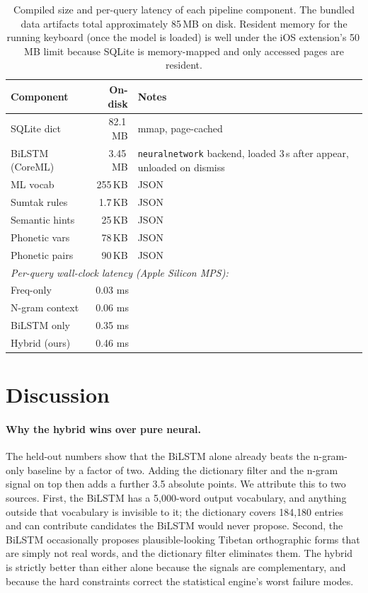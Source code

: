 \documentclass[11pt]{article}
\begin{document}
\begin{table}[t]
\centering
\small
\begin{tabular}{lrp{3.5cm}}
\toprule
Component & On-disk & Notes \\
\midrule
SQLite dict      & 82.1\,MB  & mmap, page-cached \\
BiLSTM (CoreML)  & 3.45\,MB  & \texttt{neuralnetwork} backend, loaded 3\,s after appear, unloaded on dismiss \\
ML vocab         & 255\,KB   & JSON \\
Sumtak rules     & 1.7\,KB   & JSON \\
Semantic hints   & 25\,KB    & JSON \\
Phonetic vars    & 78\,KB    & JSON \\
Phonetic pairs   & 90\,KB    & JSON \\
\midrule
\multicolumn{3}{l}{\emph{Per-query wall-clock latency (Apple Silicon MPS):}} \\
Freq-only        & \multicolumn{2}{l}{0.03 ms} \\
N-gram context   & \multicolumn{2}{l}{0.06 ms} \\
BiLSTM only      & \multicolumn{2}{l}{0.35 ms} \\
Hybrid (ours)    & \multicolumn{2}{l}{0.46 ms} \\
\bottomrule
\end{tabular}
\caption{Compiled size and per-query latency of each pipeline component. The bundled data artifacts total approximately 85\,MB on disk. Resident memory for the running keyboard (once the model is loaded) is well under the iOS extension's 50\,MB limit because SQLite is memory-mapped and only accessed pages are resident.}
\label{tab:resources}
\end{table}

\section{Discussion}
\label{sec:discussion}

\paragraph{Why the hybrid wins over pure neural.} The held-out numbers show that the BiLSTM alone already beats the n-gram-only baseline by a factor of two. Adding the dictionary filter and the n-gram signal on top then adds a further 3.5 absolute points. We attribute this to two sources. First, the BiLSTM has a 5{,}000-word output vocabulary, and anything outside that vocabulary is invisible to it; the dictionary covers 184{,}180 entries and can contribute candidates the BiLSTM would never propose. Second, the BiLSTM occasionally proposes plausible-looking Tibetan orthographic forms that are simply not real words, and the dictionary filter eliminates them. The hybrid is strictly better than either alone because the signals are complementary, and because the hard constraints correct the statistical engine's worst failure modes.
\end{document}
